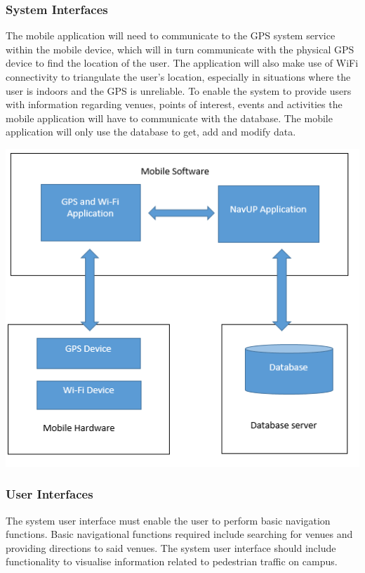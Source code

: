 \documentclass[english]{article}
\begin{document}
				\subsubsection{System Interfaces}
				The mobile application will need to communicate to the GPS system service within the mobile device, which will in turn communicate with the physical GPS device to find the location of the user. The application will also make use of WiFi connectivity to triangulate the user's location, especially in situations where the user is indoors and the GPS is unreliable.
To enable the system to provide users with information regarding venues, points of interest, events and activities the mobile application will have to communicate with the database. The mobile application will only use the database to get, add and modify data.
				\begin{center}
										\includegraphics[scale=0.8]{Block Diagram.png}								
				\end{center}


				\subsubsection{User Interfaces}
						The system user interface must enable the user to perform basic navigation functions. Basic navigational functions required include searching for venues and providing directions to said venues. The system user interface should include functionality to visualise information related to pedestrian traffic on campus.
\end{document}
